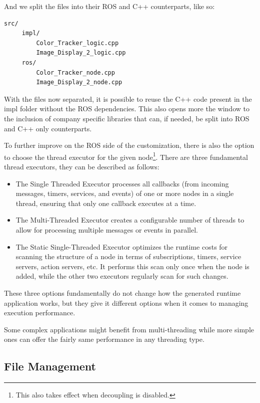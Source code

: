 And we split the files into their \gls{ROS} and C++ counterparts, like so:

\begin{verbatim}
src/
	 impl/
		 Color_Tracker_logic.cpp
		 Image_Display_2_logic.cpp
	 ros/
		 Color_Tracker_node.cpp
		 Image_Display_2_node.cpp
\end{verbatim}

With the files now separated, it is possible to reuse the C++ code present in the impl folder without the \gls{ROS} dependencies. This also opens more the window to the inclusion of company specific libraries that can, if needed, be split into \gls{ROS} and C++ only counterparts.

To further improve on the \gls{ROS} side of the customization, there is also the option to choose the thread executor for the given node\footnote{This also takes effect when decoupling is disabled.}. There are three fundamental thread executors, they can be described as follows:

\begin{itemize} 
	\item The Single Threaded Executor processes all callbacks (from incoming messages, timers, services, and events) of one or more nodes in a single thread, ensuring that only one callback executes at a time.
	\item The Multi-Threaded Executor creates a configurable number of threads to allow for processing multiple messages or events in parallel.
	\item  The Static Single-Threaded Executor optimizes the runtime costs for scanning the structure of a node in terms of subscriptions, timers, service servers, action servers, etc. It performs this scan only once when the node is added, while the other two executors regularly scan for such changes. 
\end{itemize}

These three options fundamentally do not change how the generated runtime application works, but they give it different options when it comes to managing execution performance.

\begin{tcolorbox}[colback=blue!5, colframe=blue!40!black] Some complex applications might benefit from multi-threading while more simple ones can offer the fairly same performance in any threading type.
\end{tcolorbox}


\subsection{File Management}
\label{sec:impl_file_mng}

